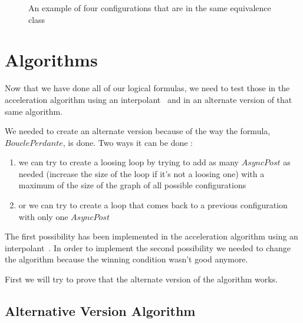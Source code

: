 \documentclass{article}
\begin{document}
\begin{figure}[!h]
    \centering
    \def\svgscale{0.8}
    
    \caption{An example of four configurations that are in the same equivalence class}
    \label{dessinEqui}
\end{figure}

\section{Algorithms}

Now that we have done all of our logical formulas, we need to test those in the acceleration algorithm using an interpolant~\cite{algo} and in an alternate version of that same algorithm.

We needed to create an alternate version because of the way the formula, $BouclePerdante$, is done. Two ways it can be done :
\begin{enumerate}
    \item we can try to create a loosing loop by trying to add as many $AsyncPost$ as needed (increase the size of the loop if it's not a loosing one) with a maximum of the size of the graph of all possible configurations
    \item or we can try to create a loop that comes back to a previous configuration with only one $AsyncPost$
\end{enumerate}

The first possibility has been implemented in the acceleration algorithm using an interpolant~\cite{algo}. In order to implement the second possibility we needed to change the algorithm because the winning condition wasn't good anymore.

First we will try to prove that the alternate version of the algorithm works.

\subsection{Alternative Version Algorithm}
\end{document}
